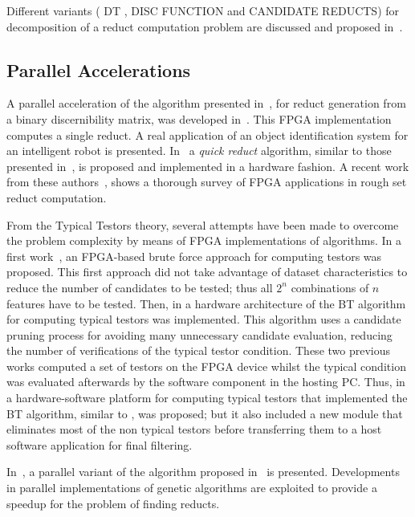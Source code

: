 \documentclass[authoryear,11pt]{elsarticle}
\makeatletter
\newcommand{\setword}[2]{%
  \phantomsection
  #1\def\@currentlabel{\unexpanded{#1}}\label{#2}%
}
\makeatother
\begin{document}
  Different variants (\setword{DT}{DT}, DISC FUNCTION and CANDIDATE REDUCTS) for decomposition of a reduct 
  computation problem are discussed and proposed in~\citep{Strakowski08}.

\subsection{Parallel Accelerations}

  A parallel acceleration of the algorithm presented in~\citep{Yang08}, for reduct generation from a binary
  discernibility matrix, was developed in~\citep{Tiwari11,Tiwari12}. This FPGA implementation computes a 
  single reduct. A real application of an object identification system for an intelligent robot is presented.
  In~\citep{Tiwari13} a \emph{quick reduct} algorithm, similar to those presented in~\citep{Chouchoulas01}, 
  is proposed and implemented in a hardware fashion. A recent work from these authors~\citep{Tiwari14}, 
  shows a thorough survey of FPGA applications in rough set reduct computation.

  From the Typical Testors theory, several attempts have been made to overcome the problem 
  complexity by means of FPGA implementations of algorithms. In a first work~\citep{Cumplido06}, an 
  FPGA-based brute force approach for computing testors was proposed. This first approach did 
  not take advantage of dataset characteristics to reduce the number of candidates to be tested; 
  thus all $2^n$ combinations of $n$ features have to be tested. Then, in \citep{Rojas07} a hardware 
  architecture of the BT algorithm for computing typical testors was implemented. 
  This algorithm uses a candidate pruning process for avoiding many unnecessary candidate evaluation, 
  reducing the number of verifications of the typical testor condition. These two previous works computed 
  a set of testors on the FPGA device whilst the typical condition was evaluated afterwards by the 
  software component in the hosting PC. Thus, in~\citep{Rojas12} a hardware-software platform for 
  computing typical testors that implemented the BT algorithm, similar to \citep{Rojas07}, was proposed; 
  but it also included a new module that eliminates most of the non typical testors before transferring them to 
  a host software application for final filtering. 
	
  In~\citep{Wroblewski98}, a parallel variant of the algorithm proposed in~\citep{Wroblewski95} is presented.
  Developments in parallel implementations of genetic algorithms are exploited to provide a speedup for the 
  problem of finding reducts.
  
\end{document}

